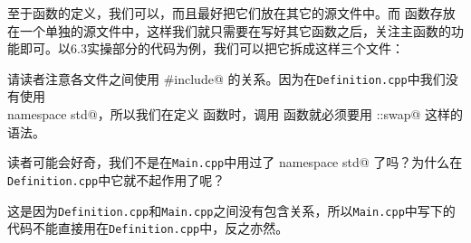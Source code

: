 至于函数的定义，我们可以，而且最好把它们放在其它的源文件中。而 \lstinline@main@ 函数存放在一个单独的源文件中，这样我们就只需要在写好其它函数之后，关注主函数的功能即可。以6.3实操部分的代码为例，我们可以把它拆成这样三个文件：


\par
请读者注意各文件之间使用 \lstinline@#include@ 的关系。因为在\texttt{Definition.cpp}中我们没有使用\\\lstinline@using namespace std@，所以我们在定义 \lstinline@transfer@ 函数时，调用 \lstinline@swap@ 函数就必须要用 \lstinline@std::swap@ 这样的语法。\par
读者可能会好奇，我们不是在\texttt{Main.cpp}中用过了 \lstinline@using namespace std@ 了吗？为什么在\texttt{Definition.cpp}中它就不起作用了呢？\par
这是因为\texttt{Definition.cpp}和\texttt{Main.cpp}之间没有包含关系，所以\texttt{Main.cpp}中写下的代码不能直接用在\texttt{Definition.cpp}中，反之亦然。\par
